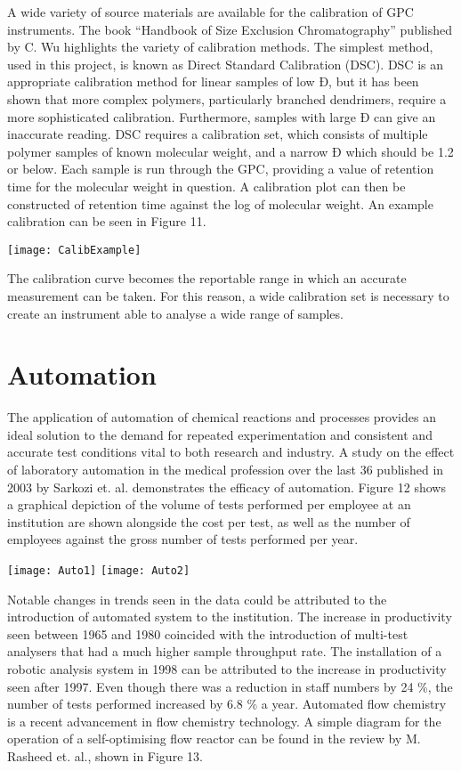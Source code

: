 A wide variety of source materials are available for the calibration of GPC instruments. The book “Handbook of Size Exclusion Chromatography” published by C. Wu highlights the variety of calibration methods. The simplest method, used in this project, is known as Direct Standard Calibration (DSC). DSC is an appropriate calibration method for linear samples of low Đ, but it has been shown that more complex polymers, particularly branched dendrimers, require a more sophisticated calibration. Furthermore, samples with large Đ can give an inaccurate reading.
DSC requires a calibration set, which consists of multiple polymer samples of known molecular weight, and a narrow Đ which should be 1.2 or below. Each sample is run through the GPC, providing a value of retention time for the molecular weight in question. A calibration plot can then be constructed of retention time against the log of molecular weight. An example calibration can be seen in Figure 11.

\texttt{[image: CalibExample]}

The calibration curve becomes the reportable range in which an accurate measurement can be taken. For this reason, a wide calibration set is necessary to create an instrument able to analyse a wide range of samples.

\section{Automation}

The application of automation of chemical reactions and processes provides an ideal solution to the demand for repeated experimentation and consistent and accurate test conditions vital to both research and industry. A study on the effect of laboratory automation in the medical profession over the last 36 published in 2003 by Sarkozi et. al. demonstrates the efficacy of automation. Figure 12 shows a graphical depiction of the volume of tests performed per employee at an institution are shown alongside the cost per test, as well as the number of employees against the gross number of tests performed per year.

\texttt{[image: Auto1]}
\texttt{[image: Auto2]}

Notable changes in trends seen in the data could be attributed to the introduction of automated system to the institution. The increase in productivity seen between 1965 and 1980 coincided with the introduction of multi-test analysers that had a much higher sample throughput rate. The installation of a robotic analysis system in 1998 can be attributed to the increase in productivity seen after 1997. Even though there was a reduction in staff numbers by 24 \%, the number of tests performed increased by 6.8 \% a year.
Automated flow chemistry is a recent advancement in flow chemistry technology. A simple diagram for the operation of a self-optimising flow reactor can be found in the review by M. Rasheed et. al., shown in Figure 13. 

